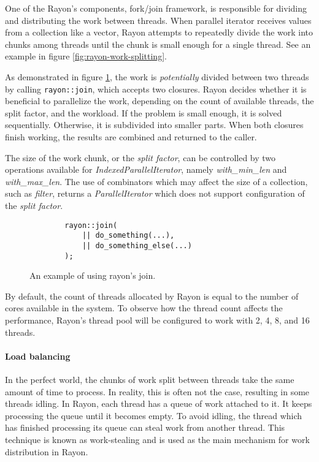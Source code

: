 One of the Rayon's components, fork/join framework, is responsible for dividing and distributing the work between threads. When parallel iterator receives values from a collection like a vector, Rayon attempts to repeatedly divide the work into chunks among threads until the chunk is small enough for a single thread. See an example in figure \ref{fig:rayon-work-splitting}.

As demonstrated in figure \ref{fig:rayon-join}, the work is \emph{potentially} divided between two threads by calling \texttt{rayon::join}, which accepts two closures. Rayon decides whether it is beneficial to parallelize the work, depending on the count of available threads, the split factor, and the workload. If the problem is small enough, it is solved sequentially. Otherwise, it is subdivided into smaller parts. When both closures finish working, the results are combined and returned to the caller. 

The size of the work chunk, or the \emph{split factor}, can be controlled by two operations available for \emph{IndexedParallelIterator}, namely \emph{with\_min\_len} and \emph{with\_max\_len}. The use of combinators which may affect the size of a collection, such as \emph{filter}, returns a \emph{ParallelIterator} which does not support configuration of the \emph{split factor}. 

\begin{figure}[!htbp]
    \centering

    \begin{verbatim}
        rayon::join(
            || do_something(...),
            || do_something_else(...)
        );
    \end{verbatim}
    
    \caption{An example of using rayon's join.}
    \label{fig:rayon-join}
\end{figure}

By default, the count of threads allocated by Rayon is equal to the number of cores available in the system. To observe how the thread count affects the performance, Rayon's thread pool will be configured to work with 2, 4, 8, and 16 threads. 

\paragraph*{Load balancing}
In the perfect world, the chunks of work split between threads take the same amount of time to process. In reality, this is often not the case, resulting in some threads idling. In Rayon, each thread has a queue of work attached to it. It keeps processing the queue until it becomes empty. To avoid idling, the thread which has finished processing its queue can steal work from another thread. This technique is known as work-stealing and is used as the main mechanism for work distribution in Rayon. 

